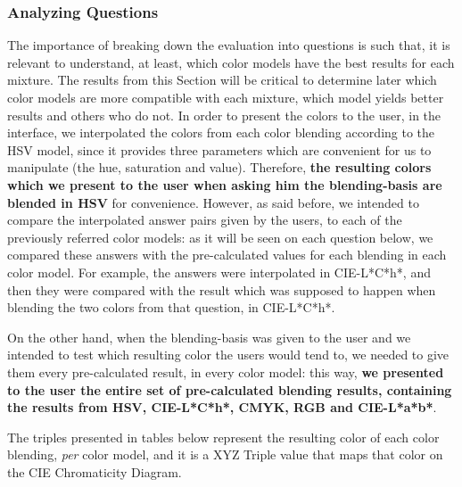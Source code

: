 \subsubsection{Analyzing Questions}
\label{subsubsec:questions_analyzing}
%
The importance of breaking down the evaluation into questions is such that, it is relevant to understand, at least, which color models have the best
results for each mixture. The results from this Section will be critical to determine later which color models are more compatible with each mixture,
which model yields better results and others who do not. In order to present the colors to the user, in the interface, we interpolated the colors from
each color blending according to the HSV model, since it provides three parameters which are convenient for us to manipulate (the hue, saturation and value).
Therefore, \textbf{the resulting colors which we present to the user when asking him the blending-basis are blended in HSV} for convenience. However, as
said before, we intended to compare the interpolated answer pairs given by the users, to each of the previously referred color models: as it will be seen
on each question below, we compared these answers with the pre-calculated values for each blending in each color model. For example, the answers were
interpolated in CIE-L*C*h*, and then they were compared with the result which was supposed to happen when blending the two colors from that question, in
CIE-L*C*h*. \par
%
On the other hand, when the blending-basis was given to the user and we intended to test which resulting color the users would tend to, we needed to give
them every pre-calculated result, in every color model: this way, \textbf{we presented to the user the entire set of pre-calculated blending results,
containing the results from HSV, CIE-L*C*h*, CMYK, RGB and CIE-L*a*b*}. \par
%
The triples presented in tables below represent the resulting color of each color blending, \emph{per} color model, and it is
a XYZ Triple value that maps that color on the CIE Chromaticity Diagram.
%
